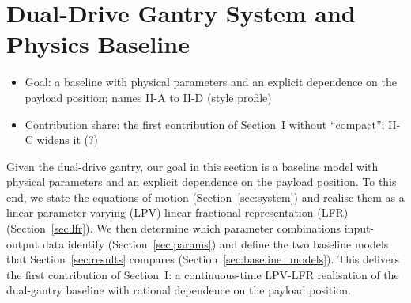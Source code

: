 \section{Dual-Drive Gantry System and Physics Baseline}\label{sec:baseline}
\ifdraft
\begin{itemize}
\item Goal: a baseline with physical parameters and an explicit dependence on the payload position; names II-A to II-D (style profile)
\item Contribution share: the first contribution of Section~I without ``compact''; II-C widens it (?)
\end{itemize}
\fi

Given the dual-drive gantry, our goal in this section is a baseline model with
physical parameters and an explicit dependence on the payload position.
To this end, we state the equations of motion (Section~\ref{sec:system}) and
realise them as a linear parameter-varying (LPV) linear fractional
representation (LFR) (Section~\ref{sec:lfr}).
We then determine which parameter combinations input-output data identify
(Section~\ref{sec:params}) and define the two baseline models that
Section~\ref{sec:results} compares (Section~\ref{sec:baseline_models}).
This delivers the first contribution of Section~I: a continuous-time LPV-LFR
realisation of the dual-gantry baseline with rational dependence on the payload
position.

